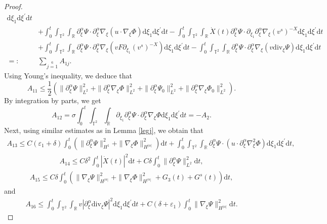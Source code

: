 \documentclass[10pt,a4paper]{amsart}
\newcommand{\ddiv}{\mathrm{div}}
\newcommand{\dif}{\mathrm{d}}
\begin{document}
\begin{proof}
\begin{align*}
\dif \xi_1\dif \xi^{\prime}\dif t\\
&
+\int_0^t\int_{\mathbb{T}^2}\int_{\mathbb{R}}
\partial_\xi^\alpha\Psi\cdot\partial_\xi^\alpha\nabla_\xi\left(u\cdot\nabla_\xi\Phi\right)
\dif \xi_1\dif \xi^{\prime}\dif t
-\int_0^t\int_{\mathbb{T}^2}\int_{\mathbb{R}}\dot X(t)
\partial_\xi^\alpha\Psi\cdot\partial_{\xi_1}\partial_\xi^\alpha\nabla_\xi(v^s)^{-X}
\dif \xi_1\dif \xi^{\prime}\dif t\\
&
+\int_0^t\int_{\mathbb{T}^2}\int_{\mathbb{R}}
\partial_\xi^\alpha\Psi\cdot\partial_\xi^\alpha\nabla_\xi\left(vF\partial_{\xi_1}(v^s)^{-X}\right)
\dif \xi_1\dif \xi^{\prime}\dif t
-\int_0^t\int_{\mathbb{T}^2}\int_{\mathbb{R}}
\partial_\xi^\alpha\Psi\cdot\partial_\xi^\alpha\nabla_\xi\left(v\ddiv_\xi\Psi\right)
\dif \xi_1\dif \xi^{\prime}\dif t\\
=:&\sum\limits_{j=1}\limits^6A_{1j}.
\end{align*}
Using Young's inequality, we deduce that
\[
A_{11}\le \frac{1}{2}\left(\|\partial_\xi^\alpha\Psi\|_{L^2}^2+\|\partial_\xi^\alpha\nabla_\xi\Phi\|_{L^2}^2
+\|\partial_\xi^\alpha\Psi_0\|_{L^2}^2+\|\partial_\xi^\alpha\nabla_\xi\Phi_0\|_{L^2}^2\right).
\]
By integration by parts, we get
\[
A_{12}=\sigma\int_0^t\int_{\mathbb{T}^2}\int_{\mathbb{R}}
\partial_{\xi_1}\partial_\xi^\alpha\Psi\cdot\partial_\xi^\alpha\nabla_\xi\Phi
\dif \xi_1\dif \xi^{\prime}\dif t
=-A_2.
\]
Next, using similar estimates as in Lemma \ref{legj}, we obtain that
\begin{align*}
A_{13}\le C(\varepsilon_1+\delta)\int_0^t\left(\|\partial_\xi^\alpha\Psi\|_{H^1}^2+\|\nabla_\xi\Phi\|_{H^{|\alpha|}}^2\right)\dif t
+\int_0^t\int_{\mathbb{T}^2}\int_{\mathbb{R}}\partial_\xi^\alpha\Psi\cdot\left(u\cdot\partial_\xi^\alpha\nabla_\xi^2\Phi\right)
\dif \xi_1\dif \xi^{\prime}\dif t,
\end{align*}
\begin{align*}
A_{14}
\le C\delta^2\int_0^t|\dot X(t)|^2\dif t+C\delta\int_0^t\|\partial_\xi^\alpha\Psi\|_{L^2}^2\dif t,
\end{align*}
\begin{align*}
A_{15}\le C\delta\int_0^t\left(\|\nabla_\xi\Psi\|_{H^{|\alpha|}}^2+\|\nabla_\xi\Phi\|_{H^{|\alpha|}}^2+G_3(t)+G^s(t)\right)
\dif t,
\end{align*}
and
\begin{align*}
A_{16}
\le \int_0^t\int_{\mathbb{T}^2}\int_{\mathbb{R}}
v|\partial_\xi^\alpha\ddiv_\xi\Psi|^2
\dif \xi_1\dif \xi^{\prime}\dif t
+C(\delta+\varepsilon_1)\int_0^t\|\nabla_\xi\Psi\|_{H^{|\alpha|}}^2\dif t.
\end{align*}

\end{proof}
\end{document}
